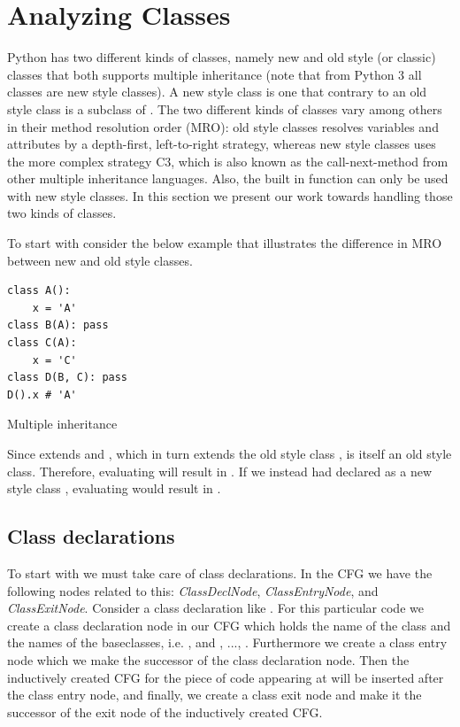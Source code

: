 \chapter{Analyzing Classes}
Python has two different kinds of classes, namely new and old style (or classic) classes that both supports multiple inheritance (note that from Python 3 all classes are new style classes). A new style class is one that contrary to an old style class is a subclass of . The two different kinds of classes vary among others in their method resolution order (MRO)\cite{pyref.typehierarchy}: old style classes resolves variables and attributes by a depth-first, left-to-right strategy, whereas new style classes uses the more complex strategy C3\cite{pyref.c3mro}, which is also known as the call-next-method from other multiple inheritance languages. Also, the built in function  can only be used with new style classes. In this section we present our work towards handling those two kinds of classes.

To start with consider the below example that illustrates the difference in MRO between new and old style classes.

\begin{listing}[H]
	\begin{verbatim}
class A():
	x = 'A'
class B(A): pass
class C(A):
	x = 'C'
class D(B, C): pass
D().x # 'A'
	\end{verbatim}
	\caption{Multiple inheritance}\label{code:OldStyleMROExample}
\end{listing}

Since  extends  and , which in turn extends the old style class ,  is itself an old style class. Therefore, evaluating  will result in . If we instead had declared  as a new style class , evaluating  would result in .


\section{Class declarations}
To start with we must take care of class declarations. In the CFG we have the following nodes related to this: \textit{ClassDeclNode}, \textit{ClassEntryNode}, and \textit{ClassExitNode}. Consider a class declaration like . For this particular code we create a class declaration node in our CFG which holds the name of the class and the names of the baseclasses, i.e. , and , ..., . Furthermore we create a class entry node which we make the successor of the class declaration node. Then the inductively created CFG for the piece of code appearing at  will be inserted after the class entry node, and finally, we create a class exit node and make it the successor of the exit node of the inductively created  CFG.

